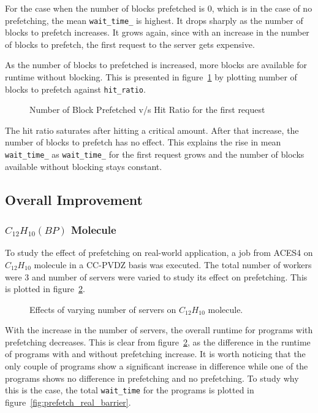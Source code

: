 For the case when the number of blocks prefetched is 0, which is in the case of no
prefetching, the mean \texttt{wait\_time\_} is highest. It drops sharply as the
number of blocks to prefetch increases. It grows again, since with an increase
in the number of blocks to prefetch, the first request to the server gets expensive.

As the number of blocks to prefetched is increased, more blocks are available for
runtime without blocking. This is presented in figure~\ref{fig:look_ahead_hit_ratio}
by plotting number of blocks to prefetch against \texttt{hit\_ratio}.

\begin{figure}[h]
  
  \caption{Number of Block Prefetched v/s Hit Ratio for the first request}
  \label{fig:look_ahead_hit_ratio}
\end{figure}

The hit ratio saturates after hitting a critical amount. After that increase, the number
of blocks to prefetch has no effect. This explains the rise in mean
\texttt{wait\_time\_} as \texttt{wait\_time\_} for the first request grows and the
number of blocks available without blocking stays constant.

\subsection{Overall Improvement}
\subsubsection{$C_{12}H_{10}(BP)$ Molecule}\label{sec:bp_molecule}
To study the effect of prefetching on real-world application, a job from ACES4 on
$C_{12}H_{10}$ molecule in a CC-PVDZ basis was executed. The total number of workers were 3 and number
of servers were varied to study its effect on prefetching. This is plotted in
figure~\ref{fig:prefetch_real}.

\begin{figure}[h]
  
  \caption{Effects of varying number of servers on $C_{12}H_{10}$ molecule.}
  \label{fig:prefetch_real}
\end{figure}

With the increase in the number of servers, the overall runtime for programs with
prefetching decreases. This is clear from figure~\ref{fig:prefetch_real}, as the difference
in the runtime of programs with and without prefetching increase. It is worth noticing
that the only couple of programs show a significant increase in difference while one
of the programs shows no difference in prefetching and no prefetching. To study
why this is the case, the total \texttt{wait\_time} for the programs is plotted in
figure~\ref{fig:prefetch_real_barrier}.

